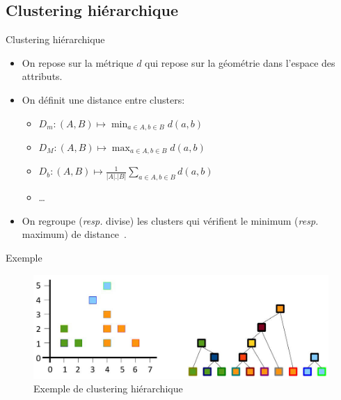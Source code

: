 \documentclass[8pt]{beamer}
\begin{document}
		\subsection{Clustering hiérarchique}
			\begin{frame}{Clustering hiérarchique}
				\begin{itemize}
					\item<1-> On repose sur la métrique \(d\) qui repose sur la géométrie dans l'espace des attributs.
					\item<2-> On définit une distance entre clusters:
						\begin{itemize}
							\item<3-> \(D_m: (A, B) \mapsto \min_{a\in A, b\in B} d(a,b)\)
							\item<4-> \(D_M: (A, B) \mapsto \max_{a\in A, b\in B} d(a,b)\)
							\item<5-> \(D_b: (A, B) \mapsto \frac{1}{\vert A \vert.\vert B \vert}\sum_{a\in A, b\in B} d(a,b)\)
							\item<6-> \dots
						\end{itemize}
					\item<7-> On regroupe (\textit{resp.} divise) les clusters qui vérifient le minimum (\textit{resp.} maximum) de distance~\cite{hastie2009unsupervised,ward1963hierarchical}.
				\end{itemize}
			\end{frame}
			\begin{frame}{Exemple}
				\begin{figure}[H]
					\includegraphics[width=.8\textwidth]{images/samples/hierchical_clustering.png}
					\caption*{Exemple de clustering hiérarchique}
				\end{figure}
			\end{frame}
\end{document}
